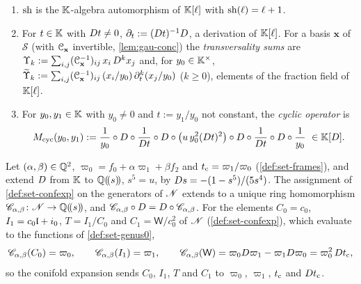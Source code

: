 \begin{defn}
\begin{enumerate}
\item $\mathrm{sh}$ is the $\mathbb{K}$-algebra automorphism of $\mathbb{K}[\ell]$ with $\mathrm{sh}(\ell)=\ell+1$.
\item For $t\in\mathbb{K}$ with $D t\neq0$, $\partial_t:=(D t)^{-1}D$, a derivation of $\mathbb{K}[\ell]$. For a basis $\mathbf x$ of $\mathcal S$ (with $\mathcal{C}_{\mathbf x}$ invertible, \cref{lem:gau-conc}) the \emph{transversality sums} are $\Upsilon_k:=\sum_{i,j}(\mathcal{C}_{\mathbf x}^{-1})_{ij}\,x_i\,D^kx_j$ and, for $y_0\in\mathbb{K}^\times$, $\widetilde\Upsilon_k:=\sum_{i,j}(\mathcal{C}_{\mathbf x}^{-1})_{ij}\,(x_i/y_0)\,\partial_t^k(x_j/y_0)$ ($k\geq0$), elements of the fraction field of $\mathbb{K}[\ell]$.
\item For $y_0,y_1\in\mathbb{K}$ with $y_0\neq0$ and $t:=y_1/y_0$ not constant, the \emph{cyclic operator} is
\begin{equation}
\label{eq:gau-Mcyc}
M_{\mathrm{cyc}}(y_0,y_1):=\frac1{y_0}\circ D\circ\frac1{D t}\circ D\circ\bigl(u\,y_0^2(D t)^2\bigr)\circ D\circ\frac1{D t}\circ D\circ\frac1{y_0}\ \in\mathbb{K}[D].
\end{equation}
\end{enumerate}
\end{defn}

\begin{lem}
\label{lem:gau-confexp}
Let $(\alpha,\beta)\in\mathbb{Q}^2$, $\varpi_0=f_0+\alpha\varpi_1+\beta f_2$ and $t_{\mathrm{c}}=\varpi_1/\varpi_0$ (\cref{def:set-frames}), and extend $D$ from $\mathbb{K}$ to $\mathbb{Q}(\!(s)\!)$, $s^5=u$, by $D s=-(1-s^5)/(5s^4)$. The assignment of \cref{def:set-confexp} on the generators of $\mathscr{N}$ extends to a unique ring homomorphism $\mathscr{C}_{\alpha,\beta}\colon\mathscr{N}\to\mathbb{Q}(\!(s)\!)$, and $\mathscr{C}_{\alpha,\beta}\circ D=D\circ\mathscr{C}_{\alpha,\beta}$. For the elements $C_0=c_0$, $I_1=c_0\mathfrak{l}+i_0$, $T=I_1/C_0$ and $C_1=\mathsf W/c_0^2$ of $\mathscr{N}$ (\cref{def:set-confexp}), which evaluate to the functions of \cref{def:set-genus0},
\[
\mathscr{C}_{\alpha,\beta}(C_0)=\varpi_0,\qquad \mathscr{C}_{\alpha,\beta}(I_1)=\varpi_1,\qquad \mathscr{C}_{\alpha,\beta}(\mathsf W)=\varpi_0D\varpi_1-\varpi_1D\varpi_0=\varpi_0^2\,Dt_{\mathrm{c}} ,
\]
so the conifold expansion sends $C_0$, $I_1$, $T$ and $C_1$ to $\varpi_0$, $\varpi_1$, $t_{\mathrm{c}}$ and $Dt_{\mathrm{c}}$.
\end{lem}

